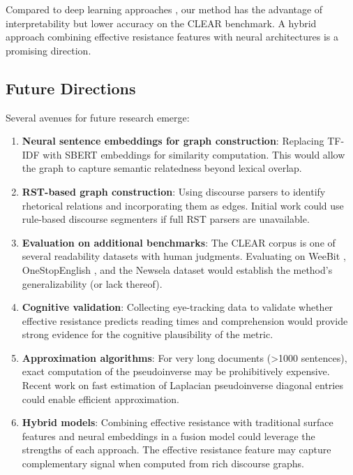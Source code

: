 \documentclass[11pt,letterpaper]{article}
\begin{document}
Compared to deep learning approaches \cite{Zhang2026}, our method has the advantage of interpretability but lower accuracy on the CLEAR benchmark. A hybrid approach combining effective resistance features with neural architectures is a promising direction.

\subsection{Future Directions}

Several avenues for future research emerge:

\begin{enumerate}
    \item \textbf{Neural sentence embeddings for graph construction}: Replacing TF-IDF with SBERT embeddings for similarity computation. This would allow the graph to capture semantic relatedness beyond lexical overlap.
    
    \item \textbf{RST-based graph construction}: Using discourse parsers to identify rhetorical relations and incorporating them as edges. Initial work could use rule-based discourse segmenters if full RST parsers are unavailable.
    
    \item \textbf{Evaluation on additional benchmarks}: The CLEAR corpus is one of several readability datasets with human judgments. Evaluating on WeeBit \cite{Deutsch2020}, OneStopEnglish \cite{Vajjala2018}, and the Newsela dataset would establish the method's generalizability (or lack thereof).
    
    \item \textbf{Cognitive validation}: Collecting eye-tracking data to validate whether effective resistance predicts reading times and comprehension would provide strong evidence for the cognitive plausibility of the metric.
    
    \item \textbf{Approximation algorithms}: For very long documents (>1000 sentences), exact computation of the pseudoinverse may be prohibitively expensive. Recent work on fast estimation of Laplacian pseudoinverse diagonal entries \cite{Lu2023} could enable efficient approximation.
    
    \item \textbf{Hybrid models}: Combining effective resistance with traditional surface features and neural embeddings in a fusion model could leverage the strengths of each approach. The effective resistance feature may capture complementary signal when computed from rich discourse graphs.
\end{enumerate}
\end{document}
